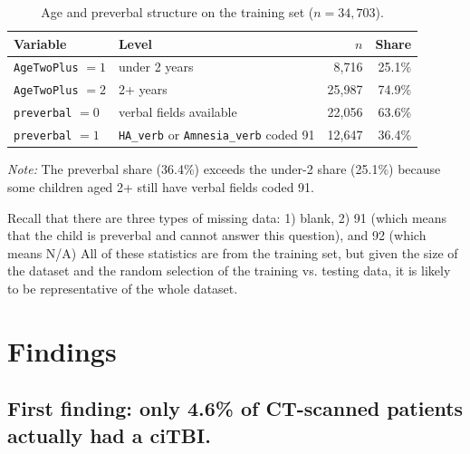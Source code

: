 \documentclass[10pt,letterpaper]{article}
\begin{document}
\begin{table}[H]
    \centering
    \caption{Age and preverbal structure on the training set ($n=34{,}703$).}
    \label{tab:age-preverbal}
    \begin{tabular}{llrr}
    \hline
    Variable & Level & $n$ & Share \\
    \hline
    \texttt{AgeTwoPlus} $=1$ & under 2 years & 8{,}716 & 25.1\% \\
    \texttt{AgeTwoPlus} $=2$ & 2+ years & 25{,}987 & 74.9\% \\
    \hline
    \texttt{preverbal} $=0$ & verbal fields available & 22{,}056 & 63.6\% \\
    \texttt{preverbal} $=1$ & \texttt{HA\_verb} or \texttt{Amnesia\_verb} coded 91 & 12{,}647 & 36.4\% \\
    \hline
    \end{tabular}
\end{table}
\noindent\textit{Note:} The preverbal share (36.4\%) exceeds the under-2 share (25.1\%) because some children aged 2+ still have verbal fields coded 91.

Recall that there are three types of missing data: 1) blank, 2) 91 (which means that the child is preverbal and cannot answer this question), and 92 (which means N/A)
All of these statistics are from the training set, but given the size of the dataset and the random selection of the training vs. testing data, it is likely to be representative of the whole dataset.

\section{Findings}\label{findings}


\subsection{First finding: only 4.6\% of CT-scanned patients actually had a ciTBI.}\label{first-finding}
\end{document}
